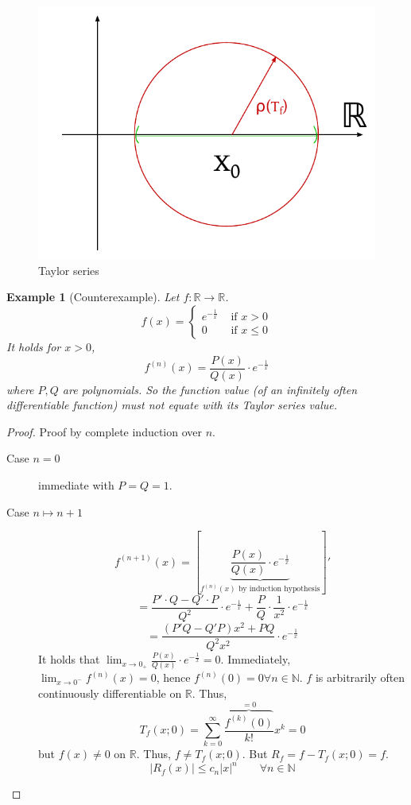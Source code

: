 \documentclass{article}
\newtheorem{example}{Example}  \numberwithin{example}{section}
\newcommand{\card}[1]{\left|#1\right|}
\begin{document}
\begin{figure}[t]
  \begin{center}
    \includegraphics[width=.5\textwidth]{img/28_Taylor_series.pdf}
    \caption{Taylor series}
    \label{img:tay}
  \end{center}
\end{figure}

\begin{example}[Counterexample]
  Let $f: \mathbb R \to \mathbb R$.
  \[ f(x) = \begin{cases} e^{-\frac1x} & \text{ if } x > 0 \\ 0 & \text{ if } x \leq 0 \end{cases} \]
  It holds for $x > 0$,
  \[ f^{(n)}(x) = \frac{P(x)}{Q(x)} \cdot e^{-\frac1x} \]
  where $P, Q$ are polynomials.
  So the function value (of an infinitely often differentiable function) must not equate with its Taylor series value.
\end{example}

\begin{proof}
  Proof by complete induction over $n$.

  \begin{description}
    \item[Case $n=0$] immediate with $P = Q = 1$.
    \item[Case $n\mapsto n+1$]
      \[ f^{(n+1)}(x) = \left[\underbrace{\frac{P(x)}{Q(x)} \cdot e^{-\frac1x}}_{f^{(n)}(x) \text{ by induction hypothesis}}\right]' \]
      \[ = \frac{P' \cdot Q - Q' \cdot P}{Q^2} \cdot e^{-\frac1x} + \frac PQ \cdot \frac1{x^2} \cdot e^{-\frac1x} \]
      \[ = \frac{(P' Q - Q' P) x^2 + PQ}{Q^2 x^2} \cdot e^{-\frac1x} \]
      It holds that $\lim_{x\to0_+} \frac{P(x)}{Q(x)} \cdot e^{-\frac1x} = 0$.
      Immediately, $\lim_{x \to 0^-} f^{(n)}(x) = 0$, hence $f^{(n)}(0) = 0 \forall n \in \mathbb N$.
      $f$ is arbitrarily often continuously differentiable on $\mathbb R$. Thus,
      \[ T_f(x; 0) = \sum_{k=0}^\infty \frac{\overbrace{f^{(k)}(0)}^{=0}}{k!} x^k = 0 \]
      but $f(x) \neq 0$ on $\mathbb R$. Thus, $f \neq T_f(x; 0)$.
      But $R_f = f - T_f(x; 0) = f$.
      \[ \card{R_f(x)} \leq c_n \card{x}^n \qquad \forall n \in \mathbb N \]
  \end{description}
\end{proof}
\end{document}
